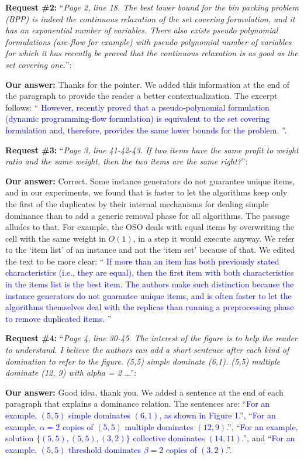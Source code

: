 \documentclass{elsarticle}
\begin{document}
\textbf{Request \#2:} ``\textit{Page 2, line 18. The best lower bound for the bin packing problem (BPP) is indeed the continuous relaxation of the set covering formulation, and it has an exponential number of variables. There also exists pseudo polynomial formulations (arc-flow for example) with pseudo polynomial number of variables for which it has recently be proved that the continuous relaxation is as good as the set covering one.}'':

\textbf{Our answer:} Thanks for the pointer. We added this information at the end of the paragraph to provide the reader a better contextualization. The excerpt follows: ``\textcolor{blue}{
However, recently \cite{eq_lb_delorme} proved that a pseudo-polynomial formulation (dynamic programming-flow formulation) is equivalent to the set covering formulation and, therefore, provides the same lower bounds for the problem.
}''.
\bigskip

\textbf{Request \#3:} ``\textit{Page 3, line 41-42-43. If two items have the same profit to weight ratio and the same weight, then the two items are the same right?}'':

\textbf{Our answer:}
Correct.
Some instance generators do not guarantee unique items, and in our experiments, we found that is faster to let the algorithms keep only the first of the duplicates by their internal mechanisms for dealing simple dominance than to add a generic removal phase for all algorithms.
The passage alludes to that.
For example, the OSO deals with equal items by overwriting the cell with the same weight in \(O(1)\), in a step it would execute anyway.
We refer to the `item list' of an instance and not the `item set' because of that.
We edited the text to be more clear: ``\textcolor{blue}{
If more than an item has both previously stated characteristics (i.e., they are equal), then the first item with both characteristics in the items list is the best item.
The authors make such distinction because the instance generators do not guarantee unique items, and is often faster to let the algorithms themselves deal with the replicas than running a preprocessing phase to remove duplicated items.
}''
\bigskip

\textbf{Request \#4:} ``\textit{Page 4, line 30-45. The interest of the figure is to help the reader to understand. I believe the authors can add a short sentence after each kind of domination to refer to the figure. (5,5) simple dominate (6,1). (5,5) multiple dominate (12, 9) with alpha = 2 \dots}'':

\textbf{Our answer:} Good idea, thank you. We added a sentence at the end of each paragraph that explains a dominance relation. The sentences are: ``\textcolor{blue}{For an example, \((5, 5)\) simple dominates \((6, 1)\), as shown in Figure 1.}'', ``\textcolor{blue}{For an example, \(\alpha = 2\) copies of \((5, 5)\) multiple dominates \((12, 9)\).}'', ``\textcolor{blue}{For an example, solution \(\{(5, 5), (5, 5), (3, 2)\}\) collective dominates \((14, 11)\).}'', and ``\textcolor{blue}{For an example, \((5, 5)\) threshold dominates \(\beta = 2\) copies of \((3, 2)\)}.''.
\bigskip
\end{document}
